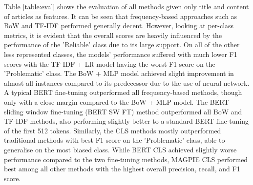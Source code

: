 Table \ref{table:eval} shows the evaluation of all methods given only title and content of articles as features. It can be seen that frequency-based approaches such as BoW and TF-IDF performed generally decent. However, looking at per-class metrics, it is evident that the overall scores are heavily influenced by the performance of the 'Reliable' class due to its large support. On all of the other less represented classes, the models' performance suffered with much lower F1 scores with the TF-IDF + LR model having the worst F1 score on the 'Problematic' class. The BoW + MLP model achieved slight improvement in almost all instances compared to its predecessor due to the use of neural network. A typical BERT fine-tuning outperformed all frequency-based methods, though only with a close margin compared to the BoW + MLP model. The BERT sliding window fine-tuning (BERT SW FT) method outperformed all BoW and TF-IDF methods, also performing slightly better to a standard BERT fine-tuning of the first 512 tokens. Similarly, the CLS methods mostly outperformed traditional methods with best F1 score on the 'Problematic' class, able to generalise on the most biased class. While BERT CLS achieved slightly worse performance compared to the two fine-tuning methods, MAGPIE CLS performed best among all other methods with the highest overall precision, recall, and F1 score.

